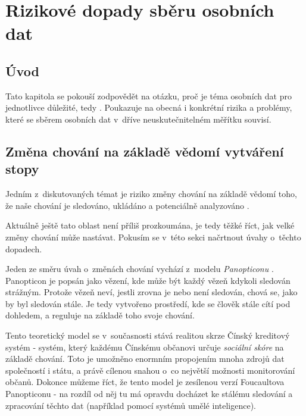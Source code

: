 \chapter{Rizikové dopady sběru osobních dat}

\section{Úvod}
Tato kapitola se pokouší zodpovědět na otázku, proč je téma osobních dat pro jednotlivce důležité, tedy . Poukazuje na obecná i konkrétní rizika a problémy, které se sběrem osobních dat v~dříve neuskutečnitelném měřítku souvisí. 



\section{Změna chování na základě vědomí vytváření stopy}

Jedním z~diskutovaných témat je riziko změny chování na základě vědomí toho, že naše chování je sledováno, ukládáno a potenciálně analyzováno \citep{behavior-changes}.

Aktuálně ještě tato oblast není příliš prozkoumána, je tedy těžké říct, jak velké změny chování může nastávat. Pokusím se v~této sekci načrtnout úvahy o~těchto dopadech.

Jeden ze směru úvah o~změnách chování vychází z~modelu \textit{Panopticonu} \citep{panopticon}. Panopticon je popsán jako vězení, kde může být každý vězeň kdykoli sledován strážným. Protože vězeň neví, jestli zrovna je nebo není sledován, chová se, jako by byl sledován stále. Je tedy vytvořeno prostředí, kde se člověk stále cítí pod dohledem, a reguluje na základě toho svoje chování.

Tento teoretický model se v~současnosti stává realitou skrze Čínský kreditový systém - systém, který každému Čínskému občanovi určuje \textit{sociální skóre} na základě chování. Toto je umožněno enormním propojením mnoha zdrojů dat společností i státu, a právě cílenou snahou o~co největší možnosti monitorování občanů. Dokonce můžeme říct, že tento model je zesílenou verzí Foucaultova Panopticonu - na rozdíl od něj tu má opravdu docházet ke stálému sledování a zpracování těchto dat (například pomocí systémů umělé inteligence).

